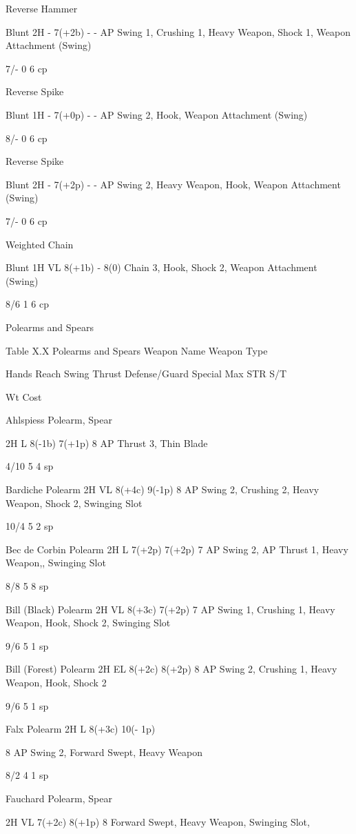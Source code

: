 \documentclass[oneside,11pt,english]{book}
\begin{document}
Reverse 
Hammer 

Blunt 2H - 7(+2b) - - AP Swing 1, Crushing 1, 
Heavy Weapon, Shock 1, 
Weapon Attachment (Swing) 

7/- 0 6 cp 

Reverse 
Spike 

Blunt 1H - 7(+0p) - - AP Swing 2, Hook, Weapon 
Attachment (Swing) 

8/- 0 6 cp 

Reverse 
Spike 

Blunt 2H - 7(+2p) - - AP Swing 2, Heavy Weapon, 
Hook, Weapon Attachment 
(Swing) 

7/- 0 6 cp 


Weighted 
Chain 

Blunt 1H VL 8(+1b) - 8(0) Chain 3, Hook, 
Shock 2, Weapon Attachment 
(Swing) 

8/6 1 6 cp 

 

Polearms and Spears 

 
Table X.X Polearms and Spears 
Weapon Name Weapon 
Type 

Hands Reach Swing Thrust Defense/Guard Special Max 
STR 
S/T 

Wt Cost 

Ahlspiess Polearm, 
Spear 

2H L 8(-1b) 7(+1p) 8 AP Thrust 3, Thin 
Blade 

4/10 5 4 sp 

Bardiche Polearm 2H VL 8(+4c) 9(-1p) 8 AP Swing 2, 
Crushing 2, Heavy 
Weapon, Shock 2, 
Swinging Slot 

10/4 5 2 sp 

Bec de Corbin Polearm 2H L 7(+2p) 7(+2p) 7 AP Swing 2, AP 
Thrust 1, Heavy 
Weapon,, 
Swinging Slot 

8/8 5 8 sp 

Bill (Black) Polearm 2H VL 8(+3c) 7(+2p) 7 AP Swing 1, 
Crushing 1, Heavy 
Weapon, Hook, 
Shock 2, Swinging 
Slot 

9/6 5 1 sp 

Bill (Forest) Polearm 2H EL 8(+2c) 8(+2p) 8 AP Swing 2, 
Crushing 1, Heavy 
Weapon, Hook, 
Shock 2 

9/6 5 1 sp 

Falx Polearm 2H L 8(+3c) 10(-
1p) 

8 AP Swing 2, 
Forward Swept, 
Heavy Weapon 

8/2 4 1 sp 

Fauchard Polearm, 
Spear 

2H VL 7(+2c) 8(+1p) 8 Forward Swept, 
Heavy Weapon, 
Swinging Slot, 
\end{document}
